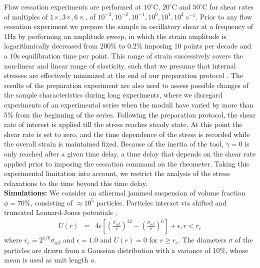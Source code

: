 \documentclass[%
preprint,
 amsmath,amssymb,
 aps,
]{revtex4-1}
\begin{document}
{{Flow cessation experiments are performed  at $10^{\circ}$C, $20^{\circ}$C and $50^{\circ}$C for shear rates of multiples of $1\times, 3\times, 6\times$, of $10^{-3}, 10^{-2}, 10^{-1}, 10^{0}, 10^{1}, 10^{2}$ s$^{-1}$. Prior to any flow cessation experiment we prepare the sample in oscillatory shear at a frequency of $1$Hz by performing an amplitude sweep, in which the strain amplitude is logarithmically decreased from $200$\% to $0.2$\% imposing 10 points per decade and a $10$s equilibration time per point. This range of strain successively covers the non-linear and linear range of elasticity, such that we presume that internal stresses are effectively minimized at the end of our preparation protocol \cite{lidon2017power}.
The results of the preparation experiment are also used to assess possible changes of the sample characteristics during long experiments, where we disregard experiments of an experimental series when the moduli have varied by more than 5\% from the beginning of the series. 
Following the preparation protocol, the shear rate of interest is applied till the stress reaches steady state. At this point the shear rate is set to zero, and the time dependence of the stress is recorded while the overall strain is maintained fixed. Because of the inertia of the tool, $\dot{\gamma} = 0$ is only reached after a given time delay, a time delay that depends on the shear rate applied prior to imposing the cessation command on the rheometer. Taking this experimental limitation into account, we restrict the analysis of the stress relaxations to the time beyond this time delay.\\

\textbf{Simulations:}
We consider an athermal jammed suspension of volume fraction $\phi = 70\%$, consisting of $\approx 10^5$ particles. Particles interact via shifted and truncated Lennard-Jones potentials \cite{weeks1971role}, 
\begin{eqnarray}
 U(r) &=& 4\epsilon \left[ \left( \frac{\sigma_{\alpha\beta}}{r}\right)^{12} - \left( \frac{\sigma_{\alpha\beta}}{r}\right)^6 \right] + \epsilon, r < r_c
\end{eqnarray}
 where $r_c = 2^{1/6} \sigma_{\alpha\beta}$ and $\epsilon = 1.0$ and $U(r)=0$ for $r \geq r_c$. The diameters $\sigma$ of the particles are drawn from a Gaussian distribution with a variance of 10\%, whose mean is used as unit length $a$.

}}
\end{document}
